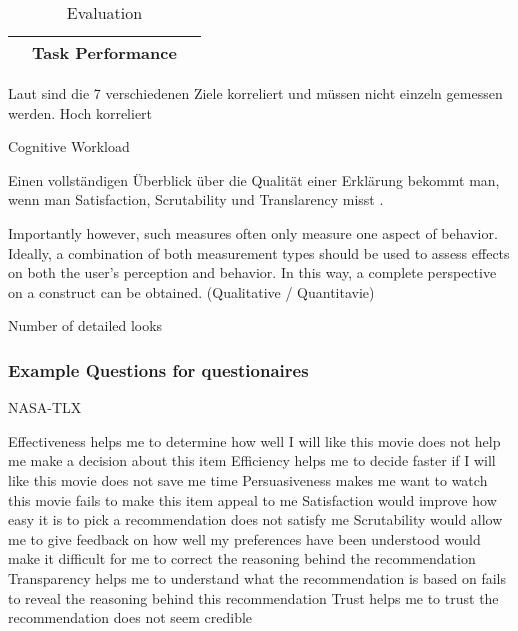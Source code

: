 \begin{table}
\begin{center}
\begin{tabular}{|p{}|p{}|p{}|}
                        & Task Performance                  & \cite{waa_evaluating_2021}  \cite{mucha_interfaces_2021}  
                                                            \cite{abdulrahman_belief-based_2019} 
                                                            \cite{zolotas_towards_2019} \cite{martin_developing_2019} 
                                                            \cite{martin_evaluating_2021} \cite{gunning2019darpa} \\
            \hline
        \end{tabular}
    \end{center}
    \caption{Evaluation}
    \label{tab:evaluation_of_explanations}
\end{table}



Laut \cite{balog_measuring_2020} sind die 7 verschiedenen Ziele korreliert und müssen nicht einzeln gemessen werden. Hoch korreliert \cite{kouki_user_2017}

Cognitive Workload \cite{wiegand2019drive, wiegand_id_2020}

Einen vollständigen Überblick über die Qualität einer Erklärung bekommt man, wenn man Satisfaction, Scrutability und Translarency misst \cite{balog_measuring_2020}.

\glqq Importantly however, such measures often only measure one aspect of behavior. Ideally, a combination of both measurement types should be used to assess effects on both the user’s perception and behavior. In this way, a complete perspective on a construct can be obtained.\grqq{} (Qualitative / Quantitavie) \cite{waa_evaluating_2021}

Number of detailed looks

\subsubsection{Example Questions for questionaires}

NASA-TLX \cite{tsai_evaluating_2019}

Effectiveness helps me to determine how well I will like this movie does not help me make a decision about this item Efficiency helps me to decide faster if I will like this movie does not save me time Persuasiveness makes me want to watch this movie fails to make this item appeal to me Satisfaction would improve how easy it is to pick a recommendation does not satisfy me Scrutability would allow me to give feedback on how well my preferences have been understood would make it difficult for me to correct the reasoning behind the recommendation Transparency helps me to understand what the recommendation is based on fails to reveal the reasoning behind this recommendation Trust helps me to trust the recommendation does not seem credible \cite{balog_measuring_2020}

